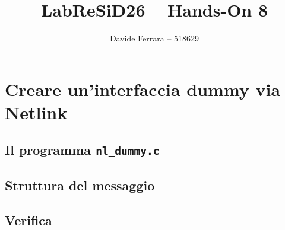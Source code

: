 \documentclass[a4paper,12pt]{article}
\title{LabReSiD26 -- Hands-On 8}
\author{Davide Ferrara -- 518629}
\date{}
\begin{document}
\maketitle

\section{Creare un'interfaccia dummy via Netlink}

\subsection*{Il programma \texttt{nl\_dummy.c}}


\subsection*{Struttura del messaggio}


\subsection*{Verifica}

\end{document}
